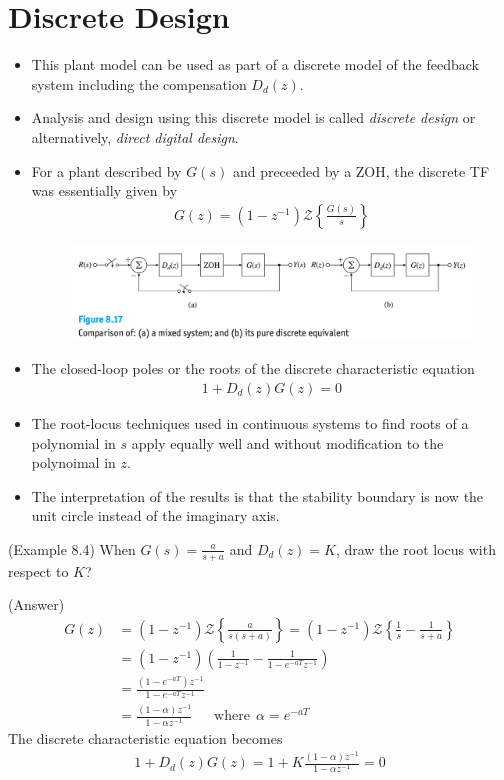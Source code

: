 \section{Discrete Design} 
%
\begin{itemize}
	\item This plant model can be used as part of a discrete model of the feedback system including the compensation $D_d(z)$. 
	\item Analysis and design using this discrete model is called \emph{discrete design} or alternatively, \emph{direct digital design}. 
	\item For a plant described by $G(s)$ and preceeded by a ZOH, the discrete TF was essentially given by 
	\begin{align*}
		G(z) = (1-z^{-1}) \mathcal{Z} \left\{ \frac{G(s)}{s} \right\}
	\end{align*}
	\begin{figure}[h]
		\includegraphics[width=12cm]{./FIG_Franklin/fig8-17.png}
	\end{figure}
	\item The closed-loop poles or the roots of the discrete characteristic equation
	\begin{align*}
		1+ D_d(z) G(z) = 0 
	\end{align*}
	\item The root-locus techniques used in continuous systems to find roots of a polynomial in $s$ apply equally well and without modification to the polynoimal in $z$.
	\item The interpretation of the results is that the stability boundary is now the unit circle instead of the imaginary axis. 
%
\end{itemize}
%

(Example 8.4)  When $G(s) = \frac{a}{s+a}$ and $D_d(z) = K$, draw the root locus with respect to $K$? 

(Answer) 
\begin{align*}
	G(z) &= (1-z^{-1}) \mathcal{Z} \left\{ \frac{a}{s(s+a)} \right\} = (1-z^{-1}) \mathcal{Z} \left\{ \frac{1}{s}  - \frac{1}{s+a} \right\} \\
	&= (1-z^{-1}) \left( \frac{1}{1-z^{-1}} - \frac{1}{1-e^{-aT}z^{-1}} \right)  \\
	&= \frac{(1-e^{-aT})z^{-1}}{1-e^{-aT}z^{-1}} \\
	&= \frac{(1-\alpha)z^{-1}}{1-\alpha z^{-1}} ~~~~~~~\mbox{where}~~ \alpha = e^{-aT}
\end{align*}
The discrete characteristic equation becomes
\begin{align*}
	1+ D_d(z) G(z) = 1 + K\frac{(1-\alpha)z^{-1}}{1-\alpha z^{-1}}= 0 
\end{align*}

